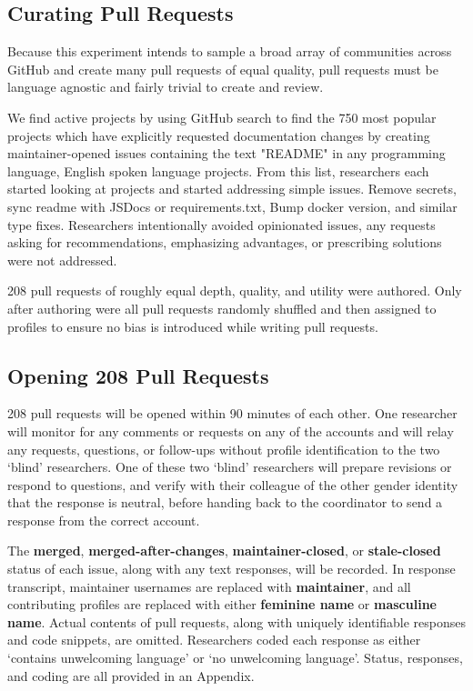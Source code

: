 \documentclass[journal,12pt,onecolumn,]{IEEEtran}
\begin{document}
\subsection{Curating Pull Requests} %

Because this experiment intends to sample a broad array of communities across GitHub and create many pull requests of equal quality, pull requests must be language agnostic and fairly trivial to create and review.

We find active projects by using GitHub search to find the 750 most popular projects which have explicitly requested documentation changes by creating maintainer-opened issues containing the text "README" in any programming language, English spoken language projects.
From this list, researchers each started looking at projects and started addressing simple issues.
Remove secrets, sync readme with JSDocs or requirements.txt, Bump docker version, and similar type fixes.
Researchers intentionally avoided opinionated issues, any requests asking for recommendations, emphasizing advantages, or prescribing solutions were not addressed.

208 pull requests of roughly equal depth, quality, and utility were authored.
Only after authoring were all pull requests randomly shuffled and then assigned to profiles to ensure no bias is introduced while writing pull requests.

\subsection{Opening 208 Pull Requests}

208 pull requests will be opened within 90 minutes of each other.
One researcher will monitor for any comments or requests on any of the accounts and will relay any requests, questions, or follow-ups without profile identification to the two `blind' researchers.
One of these two `blind' researchers will prepare revisions or respond to questions, and verify with their colleague of the other gender identity that the response is neutral, before handing back to the coordinator to send a response from the correct account.

The \textbf{merged}, \textbf{merged-after-changes}, \textbf{maintainer-closed}, or \textbf{stale-closed} status of each issue, along with any text responses, will be recorded.
In response transcript, maintainer usernames are replaced with \textbf{maintainer}, and all contributing profiles are replaced with either \textbf{feminine name} or \textbf{masculine name}.
Actual contents of pull requests, along with uniquely identifiable responses and code snippets, are omitted.
Researchers coded each response as either `contains unwelcoming language' or `no unwelcoming language'.
Status, responses, and coding are all provided in an Appendix.
\end{document}
